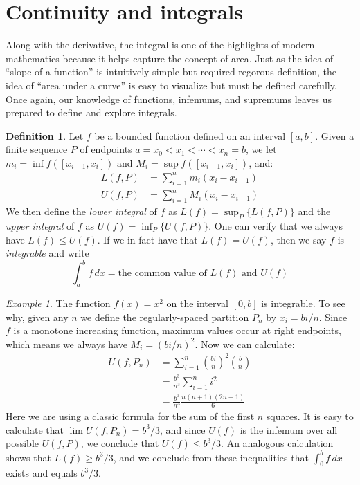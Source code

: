 \documentclass[11pt,oneside]{amsbook}
\theoremstyle{definition}
\theoremstyle{plain}
\theoremstyle{definition}
\newtheorem{definition}[theorem]{Definition}
\theoremstyle{remark}
\newtheorem{example}[theorem]{Example}
\numberwithin{equation}{section}
\numberwithin{figure}{section}
\begin{document}
\newpage
\section{Continuity and integrals}

Along with the derivative, the integral is one of the highlights of modern mathematics because it helps capture the concept of area. Just as the idea of ``slope of a function'' is intuitively simple but required regorous definition, the idea of ``area under a curve'' is easy to visualize but must be defined carefully. Once again, our knowledge of functions, infemums, and supremums leaves us prepared to define and explore integrals.

\begin{definition}
  Let $f$ be a bounded function defined on an interval $[a,b]$. Given a finite sequence $P$ of endpoints $a=x_0<x_1<\cdots<x_n=b$, we let $m_i=\inf f([x_{i-1},x_i])$ and $M_i=\sup f([x_{i-1},x_i])$, and:
  \begin{align*}
    L(f,P)&=\sum_{i=1}^n m_i(x_i-x_{i-1})\\
    U(f,P)&=\sum_{i=1}^n M_i(x_i-x_{i-1})
  \end{align*}
  We then define the \emph{lower integral} of $f$ as $L(f)=\sup_P\{L(f,P)\}$ and the \emph{upper integral} of $f$ as $U(f)=\inf_P\{U(f,P)\}$. One can verify that we always have $L(f)\leq U(f)$. If we in fact have that $L(f)=U(f)$, then we say $f$ is \emph{integrable} and write
  \[\int_a^bf\,dx=\text{the common value of }L(f)\text{ and }U(f)
  \]
\end{definition}

\begin{example}
  The function $f(x)=x^2$ on the interval $[0,b]$ is integrable. To see why, given any $n$ we define the regularly-spaced partition $P_n$ by $x_i=bi/n$. Since $f$ is a monotone increasing function, maximum values occur at right endpoints, which means we always have $M_i=(bi/n)^2$. Now we can calculate:
  \begin{align*}
    U(f,P_n)&=\sum_{i=1}^n\left(\frac{bi}{n}\right)^2\left(\frac{b}{n}\right)\\
    &=\frac{b^3}{n^3}\sum_{i=1}^n i^2\\
    &=\frac{b^3}{n^3}\frac{n(n+1)(2n+1)}{6}
  \end{align*}
  Here we are using a classic formula for the sum of the first $n$ squares. It is easy to calculate that $\lim U(f,P_n)=b^3/3$, and since $U(f)$ is the infemum over all possible $U(f,P)$, we conclude that $U(f)\leq b^3/3$. An analogous calculation shows that $L(f)\geq b^3/3$, and we conclude from these inequalities that $\int_0^bf\,dx$ exists and equals $b^3/3$.
\end{example}
\end{document}
